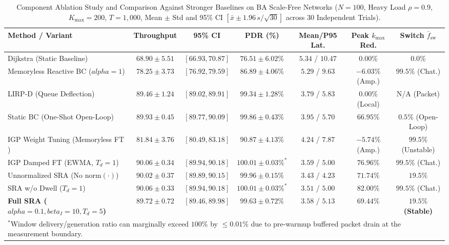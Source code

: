 \documentclass{ccjnl}
\newcommand{\rev}[1]{#1}
\def\rev#1{#1}%
\def\kappa{k}%
\def\alpha{alpha}%
\def\beta{beta}%
\begin{document}
{\begin{table}[t]
\centering
\scriptsize\setlength{\tabcolsep}{2.2pt}\renewcommand{\arraystretch}{1.05}
\caption{\rev{Component Ablation Study and Comparison Against Stronger Baselines on BA Scale-Free Networks ($N=100$, Heavy Load $\rho=0.9$, $K_{\max}=200$, $T=1{,}000$, Mean $\pm$ Std and 95\% CI $[\bar{x} \pm 1.96\,s/\sqrt{30}]$ across 30 Independent Trials).}}
\label{tab:ablation_results}
\begin{tabular*}{\textwidth}{@{\extracolsep{\fill}}lcccccc@{}}
\toprule
\textbf{Method / Variant} & \textbf{Throughput} & \textbf{95\% CI} & \textbf{PDR (\%)} & \textbf{Mean/P95 Lat.} & \textbf{Peak $\kappa_{\max}$ Red.} & \textbf{Switch $\bar{f}_{\text{sw}}$} \\
\midrule
Dijkstra (Static Baseline) & $68.90 \pm 5.51$ & $[66.93, 70.87]$ & $76.51 \pm 6.02\%$ & $5.34$ / $10.47$ & $0.00\%$ & $0.0\%$ \\
Memoryless Reactive BC ($\alpha=1$) & $78.25 \pm 3.73$ & $[76.92, 79.59]$ & $86.89 \pm 4.06\%$ & $5.29$ / $9.63$ & $-6.03\%$ (Amp.) & $99.5\%$ (Chat.) \\
LIRP-D (Queue Deflection) & $89.46 \pm 1.24$ & $[89.02, 89.91]$ & $99.34 \pm 1.28\%$ & $3.79$ / $5.83$ & $0.00\%$ (Local) & N/A (Packet) \\
Static BC (One-Shot Open-Loop) & $89.93 \pm 0.45$ & $[89.77, 90.09]$ & $99.86 \pm 0.43\%$ & $3.95$ / $5.70$ & $66.95\%$ & $0.5\%$ (Open-Loop) \\
IGP Weight Tuning (Memoryless FT \cite{Fortz2000OSPF}) & $81.84 \pm 3.76$ & $[80.49, 83.18]$ & $90.87 \pm 4.13\%$ & $4.24$ / $7.87$ & $-5.74\%$ (Amp.) & $99.5\%$ (Unstable) \\
IGP Damped FT (EWMA, $T_d=1$) & $90.06 \pm 0.34$ & $[89.94, 90.18]$ & $100.01 \pm 0.03\%^*$ & $3.59$ / $5.00$ & $76.96\%$ & $99.5\%$ (Chat.) \\
Unnormalized SRA (No $\mathrm{norm}(\cdot)$) & $90.02 \pm 0.37$ & $[89.89, 90.15]$ & $99.96 \pm 0.15\%$ & $3.43$ / $4.23$ & $71.74\%$ & $19.5\%$ \\
SRA w/o Dwell ($T_d=1$) & $90.06 \pm 0.33$ & $[89.94, 90.18]$ & $100.01 \pm 0.03\%^*$ & $3.51$ / $5.00$ & $82.00\%$ & $99.5\%$ (Chat.) \\
\midrule
\textbf{Full SRA ($\alpha=0.1, \beta_I=10, T_d=5$)} & $\mathbf{89.72 \pm 0.72}$ & $\mathbf{[89.46, 89.98]}$ & $\mathbf{99.63 \pm 0.72\%}$ & $\mathbf{3.58}$ / $\mathbf{5.13}$ & $\mathbf{69.44\%}$ & $\mathbf{19.5\%}$ \textbf{(Stable)} \\
\bottomrule
\multicolumn{7}{l}{\scriptsize\rev{$^*$Window delivery/generation ratio can marginally exceed $100\%$ by $\le 0.01\%$ due to pre-warmup buffered packet drain at the measurement boundary.}}
\end{tabular*}
\end{table}

}
\end{document}
